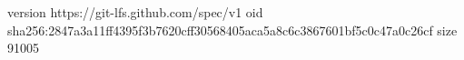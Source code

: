 version https://git-lfs.github.com/spec/v1
oid sha256:2847a3a11ff4395f3b7620cff30568405aca5a8c6c3867601bf5c0c47a0c26cf
size 91005
